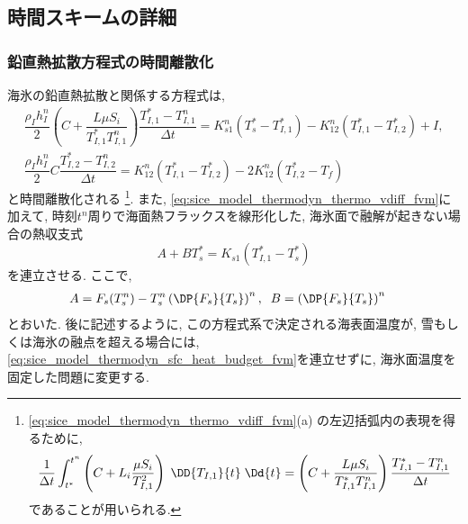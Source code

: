 \subsection{時間スキームの詳細}\label{sice_model_time_scheme_detail}
\subsubsection*{鉛直熱拡散方程式の時間離散化}
海氷の鉛直熱拡散と関係する方程式は, 
\begin{subequations}
\begin{gather}
 \dfrac{\rho_I h_I^n}{2}\left( C + \dfrac{L\mu S_i}{T_{I,1}^* T_{I,1}^n}\right)
 \dfrac{T_{I,1}^* - T_{I,1}^n}{\Delta t} 
 = K_{s1}^n (T_s^* - T_{I,1}^*) - K_{12}^n (T_{I,1}^* - T_{I,2}^*) + I, \\
 \dfrac{\rho_I h_I^n}{2}C \dfrac{T_{I,2}^* - T_{I,2}^n}{\Delta t} 
  = K_{12}^n (T^*_{I,1} - T^*_{I,2}) - 2K_{12}^n (T^*_{I,2} - T_f)
\end{gather}
\label{eq:sice_model_thermodyn_thermo_vdiff_fvm}
\end{subequations}
と時間離散化される%
\footnote{
\eqref{eq:sice_model_thermodyn_thermo_vdiff_fvm}(a) の左辺括弧内の表現を得るために,  
$$
 \frac{1}{\Delta t} \int_{t^*}^{t^n} 
 \left(C + L_i \dfrac{\mu S_i}{T_{I,1}^2} \right) \; 
  \DD{T_{I,1}}{t} \;\Dd{t} 
 =  \left( C + \dfrac{L\mu S_i}{T_{I,1}^*
     T_{I,1}^n}\right)
     \dfrac{T_{I,1}^* - T_{I,1}^n}{\Delta t} 
$$
であることが用いられる. 
}. 
また, \eqref{eq:sice_model_thermodyn_thermo_vdiff_fvm}に加えて, 
時刻$t^n$周りで海面熱フラックスを線形化した, 海氷面で融解が起きない場合の熱収支式
\begin{equation}
	A + B T_s^* = K_{s1} (T_{I,1}^* - T_s^*)
\label{eq:sice_model_thermodyn_sfc_heat_budget_fvm}
\end{equation}
を連立させる. 
ここで, 
\begin{align*}
  A 
  &= F_s(T_s^n) - T_s^n \left(\DP{F_s}{T_s}\right)^n, \;\;
  B
   = \left(\DP{F_s}{T_s}\right)^n
\end{align*} 
とおいた. 
後に記述するように, この方程式系で決定される海表面温度が, 雪もしくは海氷の融点を超える場合には, 
\eqref{eq:sice_model_thermodyn_sfc_heat_budget_fvm}を連立せずに, 海氷面温度を固定した問題に変更する. 

